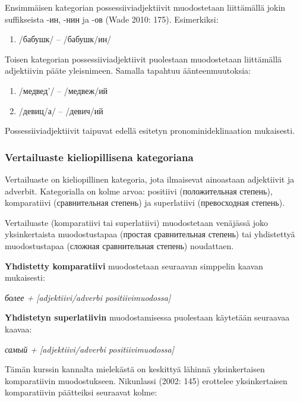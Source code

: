 \documentclass[]{scrartcl}
\providecommand{\tightlist}{%
  \setlength{\itemsep}{0pt}\setlength{\parskip}{0pt}}
\begin{document}
Ensimmäisen kategorian possessiiviadjektiivit muodostetaan liittämällä
jokin suffikseista -ин, -нин ja -ов (Wade 2010: 175). Esimerkiksi:

\begin{enumerate}
\def\labelenumi{(\arabic{enumi})}
\setcounter{enumi}{18}
\tightlist
\item
  /бабушк/ -- /бабушк/ин/
\end{enumerate}

Toisen kategorian possessiiviadjektiivit puolestaan muodostetaan
liittämällä adjektiivin pääte yleisnimeen. Samalla tapahtuu
äänteenmuutoksia:

\begin{enumerate}
\def\labelenumi{(\arabic{enumi})}
\setcounter{enumi}{19}
\tightlist
\item
  /медвед'/ -- /медвеж/ий
\item
  /девиц/а/ -- /девич/ий
\end{enumerate}

Possessiiviadjektiivit taipuvat edellä esitetyn pronominideklinaation
mukaisesti.

\subsubsection{Vertailuaste kieliopillisena
kategoriana}\label{vertailuaste-kieliopillisena-kategoriana}

Vertailuaste on kieliopillinen kategoria, jota ilmaisevat ainoastaan
adjektiivit ja adverbit. Kategorialla on kolme arvoa: positiivi
(положительная степень), komparatiivi (сравнительная степень) ja
superlatiivi (превосходная степень).

Vertailuaste (komparatiivi tai superlatiivi) muodostetaan venäjässä joko
yksinkertaista muodostustapaa (простая сравнительная степень) tai
yhdistettyä muodostustapaa (сложная сравнительная степень) noudattaen.

\textbf{Yhdistetty komparatiivi} muodostetaan seuraavan simppelin kaavan
mukaisesti:

\emph{более + {[}adjektiivi/adverbi positiivimuodossa{]}}

\textbf{Yhdistetyn superlatiivin} muodostamisessa puolestaan käytetään
seuraavaa kaavaa:

\emph{самый + {[}adjektiivi/adverbi positiivimuodossa{]}}

Tämän kurssin kannalta mielekästä on keskittyä lähinnä yksinkertaisen
komparatiivin muodostukseen. Nikunlassi (2002: 145) erottelee
yksinkertaisen komparatiivin päätteiksi seuraavat kolme:
\end{document}
